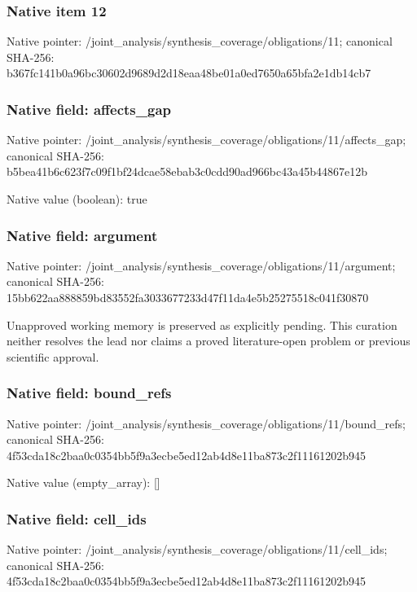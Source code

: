 \documentclass[10pt,a4paper]{article}
\begin{document}
\subsubsection{Native item 12}
Native pointer: /joint\_\allowbreak{}analysis/synthesis\_\allowbreak{}coverage/obligations/11; canonical SHA-256: b367fc141b0a96bc30602d9689d2d18eaa48be01a0ed7650a65bfa2e1db14cb7

\subsubsection{Native field: affects\_\allowbreak{}gap}
Native pointer: /joint\_\allowbreak{}analysis/synthesis\_\allowbreak{}coverage/obligations/11/affects\_\allowbreak{}gap; canonical SHA-256: b5bea41b6c623f7c09f1bf24dcae58ebab3c0cdd90ad966bc43a45b44867e12b

Native value (boolean): true

\subsubsection{Native field: argument}
Native pointer: /joint\_\allowbreak{}analysis/synthesis\_\allowbreak{}coverage/obligations/11/argument; canonical SHA-256: 15bb622aa888859bd83552fa3033677233d47f11da4e5b25275518c041f30870

\begingroup\raggedright\sloppy Unapproved working memory is preserved as explicitly pending. This curation neither resolves the lead nor claims a proved literature-open problem or previous scientific approval.\par\endgroup

\subsubsection{Native field: bound\_\allowbreak{}refs}
Native pointer: /joint\_\allowbreak{}analysis/synthesis\_\allowbreak{}coverage/obligations/11/bound\_\allowbreak{}refs; canonical SHA-256: 4f53cda18c2baa0c0354bb5f9a3ecbe5ed12ab4d8e11ba873c2f11161202b945

Native value (empty\_\allowbreak{}array): []

\subsubsection{Native field: cell\_\allowbreak{}ids}
Native pointer: /joint\_\allowbreak{}analysis/synthesis\_\allowbreak{}coverage/obligations/11/cell\_\allowbreak{}ids; canonical SHA-256: 4f53cda18c2baa0c0354bb5f9a3ecbe5ed12ab4d8e11ba873c2f11161202b945
\end{document}
